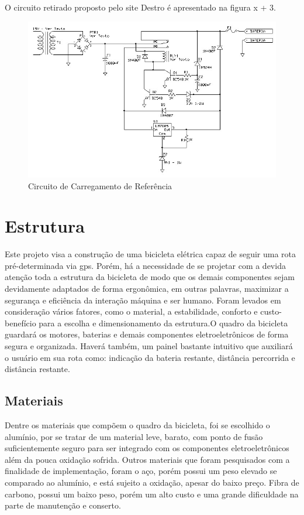 O circuito retirado proposto pelo site Destro é apresentado na figura x + 3.

	\begin{figure}[!htb]
		\centering
		\includegraphics[scale=0.5]{circuito_carregamento.jpeg}
		\caption{Circuito de Carregamento de Referência}
		\label{img:circuitocarregamento}
	\end{figure}
  
  \section{Estrutura}
  Este projeto visa a construção de uma bicicleta elétrica capaz de seguir uma rota pré-determinada via gps. Porém, há a necessidade de se projetar com a devida atenção toda a estrutura da bicicleta de modo que os demais componentes sejam devidamente adaptados de forma ergonômica, em outras palavras, maximizar a segurança e eficiência da interação máquina e ser humano.
Foram levados em consideração vários fatores, como o material, a estabilidade, conforto e custo-benefício para a escolha e dimensionamento da estrutura.O quadro da bicicleta guardará os motores, baterias e demais componentes eletroeletrônicos de forma segura e organizada. Haverá também, um painel bastante intuitivo que auxiliará o usuário em sua rota como: indicação da bateria restante, distância percorrida e distância restante.
	
	\subsection{Materiais}
	Dentre os materiais que compõem o quadro da bicicleta, foi se escolhido o alumínio, por se tratar de um material leve, barato, com ponto de fusão suficientemente seguro para ser integrado com os componentes eletroeletrônicos além da pouca oxidação sofrida. Outros materiais que foram pesquisados com a finalidade de implementação, foram o aço, porém possui um peso elevado se comparado ao alumínio, e está sujeito a oxidação, apesar do baixo preço. Fibra de carbono, possui um baixo peso, porém um alto custo e uma grande dificuldade na parte de manutenção e conserto.
	
